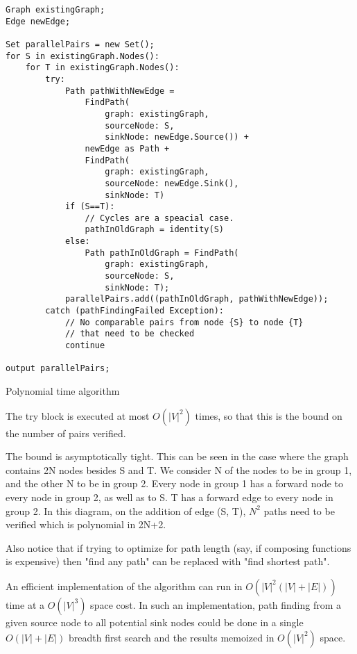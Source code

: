 \documentclass[sigplan,review,anonymous]{acmart}
\begin{document}
\begin{verbatim}
Graph existingGraph;
Edge newEdge;

Set parallelPairs = new Set();
for S in existingGraph.Nodes():
    for T in existingGraph.Nodes():
        try:
            Path pathWithNewEdge = 
                FindPath(
                    graph: existingGraph, 
                    sourceNode: S,
                    sinkNode: newEdge.Source()) +
                newEdge as Path +
                FindPath(
                    graph: existingGraph, 
                    sourceNode: newEdge.Sink(), 
                    sinkNode: T)
            if (S==T):
                // Cycles are a speacial case.
                pathInOldGraph = identity(S)
            else:
                Path pathInOldGraph = FindPath(
                    graph: existingGraph, 
                    sourceNode: S, 
                    sinkNode: T);
            parallelPairs.add((pathInOldGraph, pathWithNewEdge));
        catch (pathFindingFailed Exception):
            // No comparable pairs from node {S} to node {T} 
            // that need to be checked
            continue

output parallelPairs;
\end{verbatim}
\begin{algorithm}
    \caption{Polynomial time algorithm}
    \label{polynomial}
\end{algorithm}

The try block is executed at most $O(|V|^2)$ times, so that this is the bound on the number of pairs verified.

The bound is asymptotically tight. This can be seen in the case where the graph contains 2N nodes besides S and T. We consider N of the nodes to be in group 1, and the other N to be in group 2. Every node in group 1 has a forward node to every node in group 2, as well as to S. T has a forward edge to every node in group 2. In this diagram, on the addition of edge (S, T), $N^2$ paths need to be verified which is polynomial in 2N+2.

Also notice that if trying to optimize for path length (say, if composing functions is expensive) then "find any path" can be replaced with "find shortest path".

An efficient implementation of the algorithm can run in $O(|V|^2(|V|+|E|))$ time at a $O(|V|^3)$ space cost. In such an implementation, path finding from a given source node to all potential sink nodes could be done in a single $O(|V|+|E|)$ breadth first search and the results memoized in $O(|V|^2)$ space.
\end{document}
